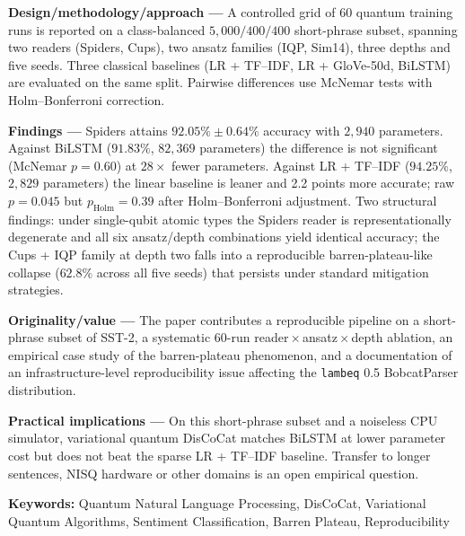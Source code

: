 \documentclass[11pt, a4paper]{article}
\begin{document}
\noindent\textbf{Design/methodology/approach --- }
A controlled grid of 60 quantum training runs is reported on a
class-balanced \(5{,}000/400/400\) short-phrase subset, spanning two
readers (Spiders, Cups), two ansatz families (IQP, Sim14), three
depths and five seeds. Three classical baselines (LR + TF--IDF,
LR + GloVe-50d, BiLSTM) are evaluated on the same split. Pairwise
differences use McNemar tests with Holm--Bonferroni correction.

\vspace{0.4em}

\noindent\textbf{Findings --- }
Spiders attains \(92.05\% \pm 0.64\%\) accuracy with \(2{,}940\)
parameters. Against BiLSTM (\(91.83\%\), \(82{,}369\) parameters)
the difference is not significant (McNemar \(p = 0.60\)) at
\(28\times\) fewer parameters. Against LR + TF--IDF (\(94.25\%\),
\(2{,}829\) parameters) the linear baseline is leaner and 2.2 points
more accurate; raw \(p = 0.045\) but
\(p_{\text{Holm}} = 0.39\) after Holm--Bonferroni adjustment. Two
structural findings: under single-qubit atomic types the Spiders
reader is representationally degenerate and all six ansatz/depth
combinations yield identical accuracy; the Cups + IQP family at
depth two falls into a reproducible barren-plateau-like collapse
(\(62.8\%\) across all five seeds) that persists under standard
mitigation strategies.

\vspace{0.4em}

\noindent\textbf{Originality/value --- }
The paper contributes a reproducible pipeline on a short-phrase
subset of SST-2, a systematic 60-run reader\,$\times$\,ansatz\,$\times$\,depth
ablation, an empirical case study of the barren-plateau phenomenon,
and a documentation of an infrastructure-level reproducibility issue
affecting the \texttt{lambeq} 0.5 BobcatParser distribution.

\vspace{0.4em}

\noindent\textbf{Practical implications --- }
On this short-phrase subset and a noiseless CPU simulator,
variational quantum DisCoCat matches BiLSTM at lower parameter cost
but does not beat the sparse LR + TF--IDF baseline. Transfer to
longer sentences, NISQ hardware or other domains is an open
empirical question.

\vspace{0.4em}

\noindent\textbf{Keywords:} Quantum Natural Language Processing,
DisCoCat, Variational Quantum Algorithms, Sentiment Classification,
Barren Plateau, Reproducibility
\end{document}
